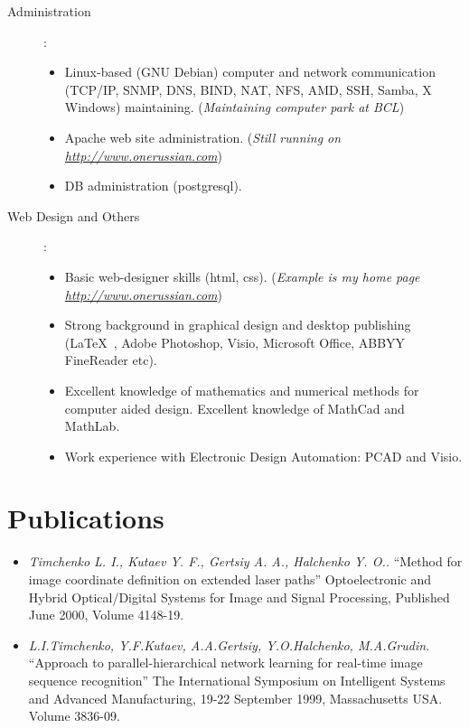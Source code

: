 \documentclass[10pt,overlapped,line]{res}
\newcommand{\wdescription}[1]{({\small \textit{#1}})}
\newcommand{\mtitle}[1]{``#1''}
\newcommand{\mauthors}[1]{ \textit{#1.}}
\newcommand{\mwhere}[1]{#1.}
\begin{document}
\begin{resume}
\begin{description}
   \item[Administration]:\\ 
     \begin{itemize}
     \item Linux-based (GNU Debian) computer and network communication (TCP/IP,
       SNMP, DNS, BIND, NAT, NFS, AMD, SSH, Samba, X Windows) maintaining. 
       \wdescription{Maintaining computer park at BCL}
     \item Apache web site administration.
       \wdescription{Still running on \href{URL}{http://www.onerussian.com}}
     \item DB administration (postgresql).
     \end{itemize}

   \item[Web Design and Others]:\\
     \begin{itemize}
     \item Basic web-designer skills (html, css).
       \wdescription{Example is my home page \href{URL}{http://www.onerussian.com}}
     \item Strong background in graphical design and desktop
       publishing (\LaTeX\ , Adobe Photoshop, Visio, Microsoft Office, ABBYY
       FineReader etc).
     \item Excellent knowledge of mathematics and numerical methods
       for computer aided design. Excellent knowledge of MathCad and
       MathLab.
     \item Work experience with Electronic Design Automation: PCAD and
       Visio.
     \end{itemize}
 \end{description}

\section{Publications}

\begin{itemize}
 
 \item 
    \mauthors{Timchenko L. I., Kutaev Y. F., Gertsiy A. A., Halchenko Y. O.}
    \mtitle{Method for image coordinate definition on extended laser paths} 
    \mwhere{Optoelectronic and Hybrid Optical/Digital Systems for Image and Signal Processing, Published June 2000,  Volume 4148-19}

 \item 
    \mauthors{L.I.Timchenko, Y.F.Kutaev, A.A.Gertsiy, Y.O.Halchenko, M.A.Grudin} 
    \mtitle{Approach to parallel-hierarchical network learning for real-time image sequence recognition} 
    \mwhere{The International Symposium on Intelligent Systems and Advanced Manufacturing, 19-22 September 1999, Massachusetts USA. Volume 3836-09}


\end{itemize}
\end{resume}
\end{document}
